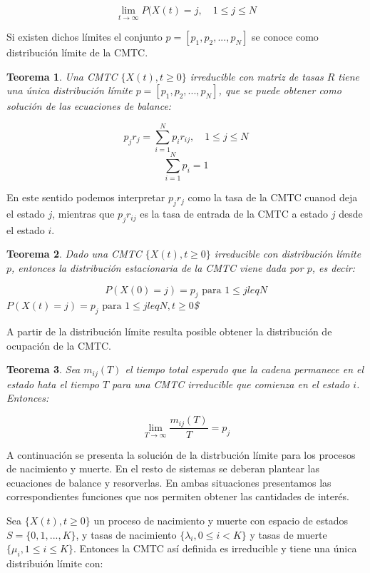 \documentclass[
]{book}
\newtheorem{theorem}{Teorema}[chapter]
\theoremstyle{definition}
\theoremstyle{definition}
\theoremstyle{definition}
\theoremstyle{definition}
\theoremstyle{remark}
\begin{document}
\[\lim_{t \rightarrow \infty} P(X(t) = j, \quad 1 \leq j \leq N\]

Si existen dichos límites el conjunto \(p = [p_1, p_2,...,p_N]\) se conoce como distribución límite de la CMTC.

\begin{theorem}
Una CMTC \(\{X(t), t \geq 0\}\) irreducible con matriz de tasas \(R\) tiene una única distribución límite \(p = [p_1, p_2,...,p_N]\), que se puede obtener como solución de las ecuaciones de balance:

\[p_j r_j = \sum_{i=1}^N p_ir_{ij}, \quad 1 \leq j \leq N\]
\[\sum_{i=1}^N p_i = 1\]
\end{theorem}

En este sentido podemos interpretar \(p_jr_j\) como la tasa de la CMTC cuanod deja el estado \(j\), mientras que \(p_jr_{ij}\) es la tasa de entrada de la CMTC a estado \(j\) desde el estado \(i\).

\begin{theorem}
Dado una CMTC \(\{X(t), t \geq 0\}\) irreducible con distribución límite \(p\), entonces la distribución estacionaria de la CMTC viene dada por \(p\), es decir:

\[P(X(0) = j) = p_j \text{ para } 1 \leq j leq N\]
\(P(X(t) = j) = p_j \text{ para } 1 \leq j leq N, t \geq 0\)\$
\end{theorem}

A partir de la distribución límite resulta posible obtener la distribución de ocupación de la CMTC.

\begin{theorem}
Sea \(m_{ij}(T)\) el tiempo total esperado que la cadena permanece en el estado hata el tiempo \(T\) para una CMTC irreducible que comienza en el estado \(i\). Entonces:

\[\lim_{T \rightarrow \infty} \frac{m_{ij}(T)}{T} = p_j\]
\end{theorem}

A continuación se presenta la solución de la distrbución límite para los procesos de nacimiento y muerte. En el resto de sistemas se deberan plantear las ecuaciones de balance y resorverlas. En ambas situaciones presentamos las correspondientes funciones que nos permiten obtener las cantidades de interés.

Sea \(\{X(t), t \geq 0\}\) un proceso de nacimiento y muerte con espacio de estados \(S = \{0, 1,...,K\}\), y tasas de nacimiento \(\{\lambda_i, 0 \leq i < K\}\) y tasas de muerte \(\{\mu_i, 1 \leq i \leq K\}\). Entonces la CMTC así definida es irreducible y tiene una única distribuión límite con:
\end{document}
